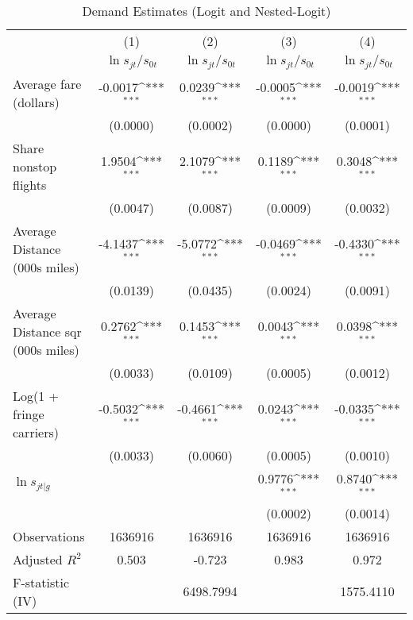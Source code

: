 \begin{table}[htbp]\centering
\def\sym#1{\ifmmode^{#1}\else\(^{#1}\)\fi}
\caption{Demand Estimates (Logit and Nested-Logit)}
\begin{tabular}{l*{4}{c}}
\toprule
                    &\multicolumn{1}{c}{(1)}&\multicolumn{1}{c}{(2)}&\multicolumn{1}{c}{(3)}&\multicolumn{1}{c}{(4)}\\
                    &\multicolumn{1}{c}{$\ln s_{jt}/s_{0t}$}&\multicolumn{1}{c}{$\ln s_{jt}/s_{0t}$}&\multicolumn{1}{c}{$\ln s_{jt}/s_{0t}$}&\multicolumn{1}{c}{$\ln s_{jt}/s_{0t}$}\\
\midrule
Average fare (dollars)&     -0.0017\sym{***}&      0.0239\sym{***}&     -0.0005\sym{***}&     -0.0019\sym{***}\\
                    &    (0.0000)         &    (0.0002)         &    (0.0000)         &    (0.0001)         \\
\addlinespace
Share nonstop flights &      1.9504\sym{***}&      2.1079\sym{***}&      0.1189\sym{***}&      0.3048\sym{***}\\
                    &    (0.0047)         &    (0.0087)         &    (0.0009)         &    (0.0032)         \\
\addlinespace
Average Distance (000s miles)&     -4.1437\sym{***}&     -5.0772\sym{***}&     -0.0469\sym{***}&     -0.4330\sym{***}\\
                    &    (0.0139)         &    (0.0435)         &    (0.0024)         &    (0.0091)         \\
\addlinespace
Average Distance sqr (000s miles)&      0.2762\sym{***}&      0.1453\sym{***}&      0.0043\sym{***}&      0.0398\sym{***}\\
                    &    (0.0033)         &    (0.0109)         &    (0.0005)         &    (0.0012)         \\
\addlinespace
Log(1 + fringe carriers)&     -0.5032\sym{***}&     -0.4661\sym{***}&      0.0243\sym{***}&     -0.0335\sym{***}\\
                    &    (0.0033)         &    (0.0060)         &    (0.0005)         &    (0.0010)         \\
\addlinespace
$\ln s_{jt|g}$      &                     &                     &      0.9776\sym{***}&      0.8740\sym{***}\\
                    &                     &                     &    (0.0002)         &    (0.0014)         \\
\midrule
Observations        &     1636916         &     1636916         &     1636916         &     1636916         \\
Adjusted \(R^{2}\)  &       0.503         &      -0.723         &       0.983         &       0.972         \\
F-statistic (IV)    &                     &   6498.7994         &                     &   1575.4110         \\
\bottomrule
\end{tabular}
\end{table}
